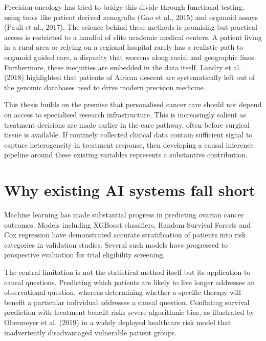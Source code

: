Precision oncology has tried to bridge this divide through functional testing, using tools like patient derived xenografts (Gao et al., 2015) and organoid assays (Pauli et al., 2017). The science behind these methods is promising but practical access is restricted to a handful of elite academic medical centers. A patient living in a rural area or relying on a regional hospital rarely has a realistic path to organoid guided care, a disparity that worsens along racial and geographic lines. Furthermore, these inequities are embedded in the data itself. Landry et al. (2018) highlighted that patients of African descent are systematically left out of the genomic databases used to drive modern precision medicine.

This thesis builds on the premise that personalised cancer care should not depend on access to specialised research infrastructure. This is increasingly salient as treatment decisions are made earlier in the care pathway, often before surgical tissue is available. If routinely collected clinical data contain sufficient signal to capture heterogeneity in treatment response, then developing a causal inference pipeline around these existing variables represents a substantive contribution.

\section{Why existing AI systems fall short}\label{why-existing-ai-systems-fall-short}

Machine learning has made substantial progress in predicting ovarian cancer outcomes. Models including XGBoost classifiers, Random Survival Forests and Cox regression have demonstrated accurate stratification of patients into risk categories in validation studies. Several such models have progressed to prospective evaluation for trial eligibility screening.

The central limitation is not the statistical method itself but its application to causal questions. Predicting which patients are likely to live longer addresses an observational question, whereas determining whether a specific therapy will benefit a particular individual addresses a causal question. Conflating survival prediction with treatment benefit risks severe algorithmic bias, as illustrated by Obermeyer et al. (2019) in a widely deployed healthcare risk model that inadvertently disadvantaged vulnerable patient groups.

